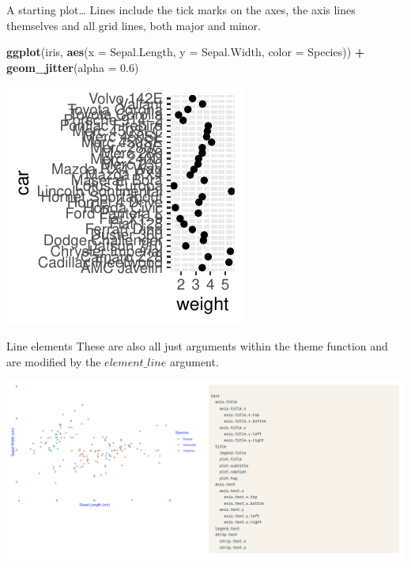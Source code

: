 \documentclass[
  ignorenonframetext,
]{beamer}
\newenvironment{Shaded}{\begin{snugshade}}{\end{snugshade}}
\newcommand{\AttributeTok}[1]{\textcolor[rgb]{0.13,0.29,0.53}{#1}}
\newcommand{\FloatTok}[1]{\textcolor[rgb]{0.00,0.00,0.81}{#1}}
\newcommand{\FunctionTok}[1]{\textcolor[rgb]{0.13,0.29,0.53}{\textbf{#1}}}
\newcommand{\NormalTok}[1]{#1}
\newcommand{\SpecialCharTok}[1]{\textcolor[rgb]{0.81,0.36,0.00}{\textbf{#1}}}
\begin{document}
\begin{frame}[fragile]{A starting plot\ldots{}}
\label{a-starting-plot-2}
Lines include the tick marks on the axes, the axis lines themselves and
all grid lines, both major and minor.


\begin{Shaded}
\begin{Highlighting}[]
\FunctionTok{ggplot}\NormalTok{(iris, }\FunctionTok{aes}\NormalTok{(}\AttributeTok{x =}\NormalTok{ Sepal.Length, }\AttributeTok{y =}\NormalTok{ Sepal.Width, }\AttributeTok{color =}\NormalTok{ Species)) }\SpecialCharTok{+}
    \FunctionTok{geom\_jitter}\NormalTok{(}\AttributeTok{alpha =} \FloatTok{0.6}\NormalTok{)}
\end{Highlighting}
\end{Shaded}

\begin{center}\includegraphics[width=0.5\linewidth]{Figs/unnamed-chunk-64-1} \end{center}
\end{frame}

\begin{frame}{Line elements}
\label{line-elements}
These are also all just arguments within the theme function and are
modified by the \(element\_line\) argument.

\includegraphics{../images/im212.png}
\end{frame}
\end{document}
